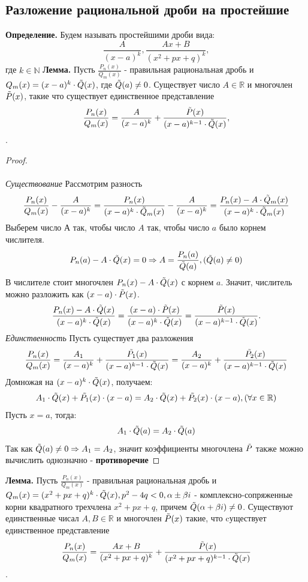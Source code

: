 \documentclass{article}
\newcommand*{\lemma}[1]{\textbf{Лемма.} #1. \newline}
\newcommand*{\definition}[1]{\textbf{Определение.} #1 \newline}
\newcommand*{\R}{\mathbb{R}}
\newcommand*{\p}[1][n]{P_{#1}(x)}
\newcommand*{\Q}[1][m]{Q_{#1}(x)}
\newcommand*{\Rfrac}[2]{\frac{\p{#1}}{\Q{#2}}}
\newcommand*{\sfrac}{\frac{A}{(x - a)^k}}
\newcommand*{\Sfrac}{\frac{Ax+B}{(x^2 + px + q)^k}}
\begin{document}
\subsection{Разложение рациональной дроби на простейшие}
\definition{Будем называть простейшими дроби вида: 
$$
    \sfrac, \Sfrac,
$$
где $k \in \mathbb{N}$
}
\lemma{Пусть $\Rfrac{}{}$ - правильная рациональная дробь и $\Q{} = (x - a)^k \cdot \Tilde{Q}(x)$, где $\Tilde{Q}(a) \neq 0$. Существует число $A \in \mathbb{R}$ и многочлен $\Tilde{P}(x)$, такие что существует единственное представление
$$
    \Rfrac{}{} = \sfrac + \frac{\Tilde{P}(x)}{(x - a)^{k - 1} \cdot \Tilde{Q}(x)},
$$
}
\begin{proof}
    \textit{\\\\Существование}
    Рассмотрим разность 
    $$ 
        \Rfrac{}{} - \sfrac = \frac{P_n(x)}{(x - a)^k \cdot \Tilde{Q}_m(x)} - \sfrac = \frac{\p{} - A \cdot \Tilde{Q}_m(x)}{(x - a)^k \cdot \Tilde{Q}_m(x)}
    $$
    Выберем число А так, чтобы число $A$ так, чтобы число $a$ было корнем числителя. 
    $$
        P_n(a) - A \cdot \Tilde{Q}(x) = 0 \Rightarrow A = \frac{P_n(a)}{\Tilde{Q}(a)}, (\Tilde{Q}(a) \neq 0)
    $$
    В числителе стоит многочлен $\p - A \cdot \Tilde{Q}(x)$ с корнем $a$. Значит, числитель можно разложить как $(x - a) \cdot \Tilde{P}(x)$. 
    $$
        \frac{\p - A \cdot \Tilde{Q}(x)}{(x - a)^k \cdot \Tilde{Q}(x)} = \frac{(x - a) \cdot \Tilde{P}(x)}{(x - a)^k \cdot \Tilde{Q}(x)} = \frac{\Tilde{P}(x)}{(x - a)^{k - 1} \cdot \Tilde{Q}(x)}.
    $$
    \textit{Единственность}
    Пусть существует два разложения
    $$
        \Rfrac{}{} = \frac{A_1}{(x - a)^k} + \frac{\Tilde{P_1}(x)}{(x-a)^{k-1} \cdot \Tilde{Q}(x)} = \frac{A_2}{(x - a)^k} + \frac{\Tilde{P_2}(x)}{(x-a)^{k-1} \cdot \Tilde{Q}(x)}
    $$ 
    Домножая на $(x - a)^k \cdot \Tilde{Q}(x)$, получаем:
    $$
        A_1 \cdot \Tilde{Q}(x) + \Tilde{P_1}(x) \cdot (x - a) = A_2 \cdot \Tilde{Q}(x) + \Tilde{P_2}(x) \cdot (x - a), (\forall x \in \mathbb{R})
    $$
    Пусть $x = a$, тогда: 
    $$
        A_1 \cdot \Tilde{Q}(a) = A_2 \cdot \Tilde{Q}(a)
    $$
    Так как $\Tilde{Q}(a) \neq 0 \Rightarrow A_1 = A_2$, значит коэффициенты многочлена $\Tilde{P}$ также можно вычислить однозначно - \textbf{противоречие}
\end{proof}
\lemma{Пусть $\Rfrac{}{}$ - правильная рациональная дробь и $\Q = (x^2 + px + q)^k \cdot \Tilde{Q}(x), p^2 - 4q < 0, \alpha \pm \beta i$ - комплексно-сопряженные корни квадратного трехчлена $x^2 + px + q$, причем $\Tilde{Q}(\alpha + \beta i) \neq 0$. Существуют единственные чисал $A, B \in \R$ и многочлен $\Tilde{P}(x)$ такие, что cуществует единственное представление
$$
    \Rfrac{}{} = \Sfrac + \frac{\Tilde{P}(x)}{(x^2 + px + q)^{k - 1} \cdot \Tilde{Q}(x)}
$$
}
\end{document}
